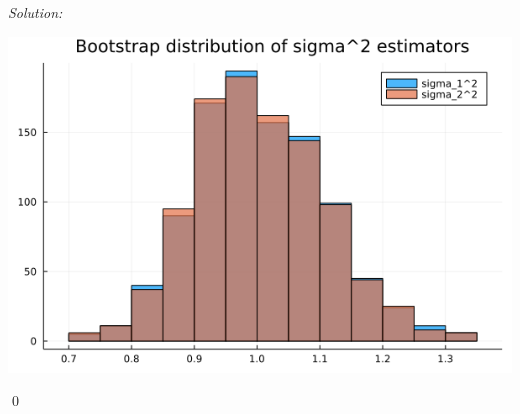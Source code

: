 \documentclass[12pt]{article}
\newenvironment{sol}
    {\emph{Solution:}
    }
    {
    \qed
    }
\begin{document}
\begin{sol}
\begin{enumerate}[label=\alph*) ]
\begin{center}
        \end{center}
        \begin{center}
            \includegraphics[scale=0.5]{sigma_bootstrap.png}
        \end{center}
    \end{enumerate}
\end{sol}
\end{document}
